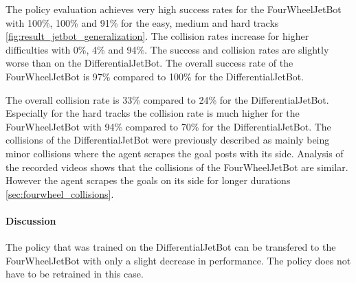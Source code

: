 The policy evaluation achieves very high success rates for the FourWheelJetBot with 100\%, 100\% and 91\% for the easy, medium and hard tracks \ref{fig:result_jetbot_generalization}. The collision rates increase for higher difficulties with 0\%, 4\% and 94\%. 
The success and collision rates are slightly worse than on the DifferentialJetBot. The overall success rate of the FourWheelJetBot is 97\% compared to 100\% for the DifferentialJetBot. 

The overall collision rate is 33\% compared to 24\% for the DifferentialJetBot. Especially for the hard tracks the collision rate is much higher for the FourWheelJetBot with 94\% compared to 70\% for the DifferentialJetBot.
The collisions of the DifferentialJetBot were previously described as mainly being minor collisions where the agent scrapes the goal posts with its side. Analysis of the recorded videos shows that the collisions of the FourWheelJetBot are similar. However the agent scrapes the goals on its side for longer durations \ref{sec:fourwheel_collisions}.




\paragraph{Discussion}

The policy that was trained on the DifferentialJetBot can be transfered to the FourWheelJetBot with only a slight decrease in performance.
The policy does not have to be retrained in this case. 


